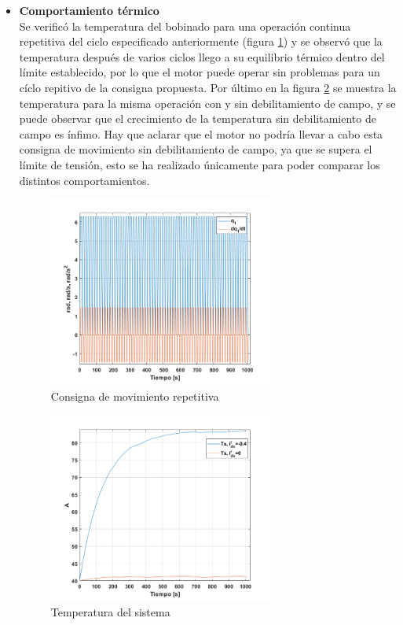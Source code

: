 \documentclass[10pt]{article}
\begin{document}
\begin{itemize}
\item \textbf{Comportamiento térmico}\\
Se verificó la temperatura del bobinado para una operación continua repetitiva del ciclo especificado anteriormente (figura \ref{fig:rep}) y se observó que la temperatura después de varios ciclos llego a su equilibrio térmico dentro del límite establecido, por lo que el motor puede operar sin problemas para un cíclo repitivo de la consigna propuesta. Por último en la figura \ref{fig:temp} se muestra la temperatura para la misma operación con y sin debilitamiento de campo, y se puede observar que el crecimiento de la temperatura
 sin debilitamiento de campo es ínfimo. Hay que aclarar que el motor no podría llevar a cabo esta consigna de movimiento sin debilitamiento de campo, ya que se supera el límite de tensión,
  esto se ha realizado únicamente para poder comparar los distintos comportamientos.
  \begin{figure}[h!]
	\centering
	\includegraphics[width=0.7\textwidth]{rep.png}
	\caption{\label{fig:rep}Consigna de movimiento repetitiva}
	\end{figure}
	\begin{figure}[h!]
		\centering
		\includegraphics[width=0.7\textwidth]{temp.png}
		\caption{\label{fig:temp}Temperatura del sistema}
		\end{figure}


\end{itemize}
\end{document}
